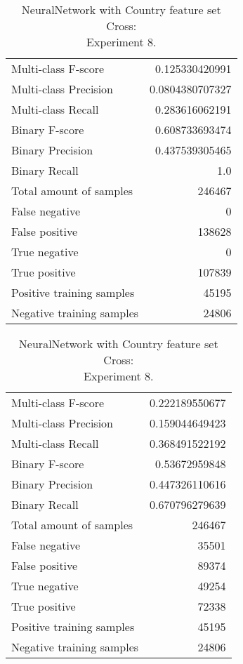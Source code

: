 \begin{table}[H]
\begin{minipage}{0.5\textwidth}
\caption{NeuralNetwork with Country feature set Cross: \\Experiment 7.}
\centering
\begin{tabular}{l r}
\toprule
Multi-class F-score & 0.125330420991 \\
Multi-class Precision & 0.0804380707327 \\
Multi-class Recall & 0.283616062191 \\
\midrule
Binary F-score & 0.608733693474 \\
Binary Precision & 0.437539305465 \\
Binary Recall & 1.0 \\
\midrule
Total amount of samples & 246467 \\
False negative & 0 \\
False positive & 138628 \\
True negative & 0 \\
True positive & 107839 \\
\midrule
Positive training samples & 45195 \\
Negative training samples & 24806 \\
\bottomrule
\end{tabular}
\end{minipage}
\hfillx
\begin{minipage}{0.5\textwidth}
\caption{NeuralNetwork with Country feature set Cross: \\Experiment 8.}
\centering
\begin{tabular}{l r}
\toprule
Multi-class F-score & 0.222189550677 \\
Multi-class Precision & 0.159044649423 \\
Multi-class Recall & 0.368491522192 \\
\midrule
Binary F-score & 0.53672959848 \\
Binary Precision & 0.447326110616 \\
Binary Recall & 0.670796279639 \\
\midrule
Total amount of samples & 246467 \\
False negative & 35501 \\
False positive & 89374 \\
True negative & 49254 \\
True positive & 72338 \\
\midrule
Positive training samples & 45195 \\
Negative training samples & 24806 \\
\bottomrule
\end{tabular}
\end{minipage}
\end{table}
